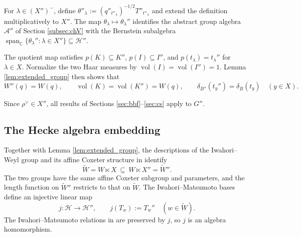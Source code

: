 \documentclass[12pt]{article}
\numberwithin{equation}{section}
\theoremstyle{definition}
\theoremstyle{remark}
\theoremstyle{plain}
\begin{document}
For $\lambda\in(X'')^-$, define $\theta''_\lambda:=(q''_{t''_\lambda})^{-1/2}T''_{t''_\lambda}$ and extend the definition multiplicatively to $X''$. The map $\theta_\lambda\mapsto\theta_\lambda''$ identifies the abstract group algebra $\mathcal A''$ of Section \ref{subsec:chV} with the Bernstein subalgebra $\operatorname{span}_{\mathbb C}\{\theta_\lambda'':\lambda\in X''\}\subseteq\mathcal H''$.

The quotient map satisfies $p(K)\subseteq K''$, $p(I)\subseteq I''$, and $p(t_\lambda)=t_\lambda''$ for $\lambda\in X$.
Normalize the two Haar measures by $\operatorname{vol}(I)=\operatorname{vol}(I'')=1$. Lemma \ref{lem:extended_group} then shows that
$$W''(q)=W(q),\qquad
\operatorname{vol}(K)=\operatorname{vol}(K'')=W(q),\qquad
\delta_{\overline B''}(t_y'')=\delta_{\overline B}(t_y)\quad(y\in X).$$

Since $\rho^\vee \in X''$, all results of Sections \ref{sec:bbf}--\ref{sec:cs} apply to $G''$.

\subsection{The Hecke algebra embedding}

Together with Lemma \ref{lem:extended_group}, the descriptions of the Iwahori--Weyl group and its affine Coxeter structure in \cite[Section 2.9 and Proposition 3.2.2]{Rostami} identify
$$\widetilde{W} = W \ltimes X \ \subseteq\ W \ltimes X'' = \widetilde{W}''.$$
The two groups have the same affine Coxeter subgroup and parameters, and the length function on $\widetilde W''$ restricts to that on $\widetilde W$. The Iwahori--Matsumoto bases define an injective linear map
$$j:\mathcal H\longrightarrow\mathcal H'',\qquad j(T_w):=T_w''\quad(w\in\widetilde W).$$
The Iwahori--Matsumoto relations in \cite[Proposition 4.1.1]{Rostami} are preserved by $j$, so $j$ is an algebra homomorphism.
\end{document}
